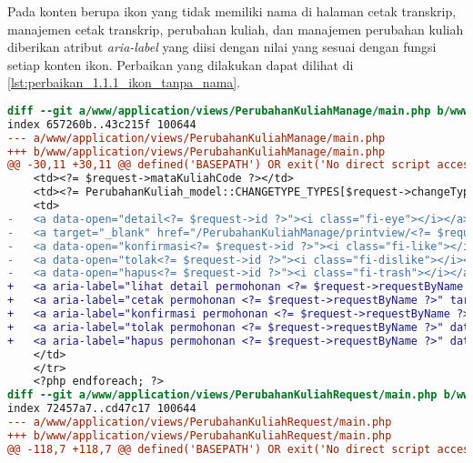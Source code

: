 Pada konten berupa ikon yang tidak memiliki nama di halaman cetak transkrip, manajemen cetak transkrip, perubahan kuliah, dan manajemen perubahan kuliah diberikan atribut \textit{aria-label} yang diisi dengan nilai yang sesuai dengan fungsi setiap konten ikon. Perbaikan yang dilakukan dapat dilihat di \ref{lst:perbaikan_1.1.1_ikon_tanpa_nama}.
\begin{lstlisting}[frame=single, label={lst:perbaikan_1.1.1_ikon_tanpa_nama}, language=diff, caption=Perbaikan Kriteria Sukses 1.1.1 - Ikon Tanpa Nama]
diff --git a/www/application/views/PerubahanKuliahManage/main.php b/www/application/views/PerubahanKuliahManage/main.php
index 657260b..43c215f 100644
--- a/www/application/views/PerubahanKuliahManage/main.php
+++ b/www/application/views/PerubahanKuliahManage/main.php
@@ -30,11 +30,11 @@ defined('BASEPATH') OR exit('No direct script access allowed');
    <td><?= $request->mataKuliahCode ?></td>
    <td><?= PerubahanKuliah_model::CHANGETYPE_TYPES[$request->changeType] ?></td>
    <td>
-   <a data-open="detail<?= $request->id ?>"><i class="fi-eye"></i></a>
-   <a target="_blank" href="/PerubahanKuliahManage/printview/<?= $request->id ?>"><i class="fi-print"></i></a>
-   <a data-open="konfirmasi<?= $request->id ?>"><i class="fi-like"></i></a>                                    
-   <a data-open="tolak<?= $request->id ?>"><i class="fi-dislike"></i></a>
-   <a data-open="hapus<?= $request->id ?>"><i class="fi-trash"></i></a>
+   <a aria-label="lihat detail permohonan <?= $request->requestByName ?>" data-open="detail<?= $request->id ?>"><i class="fi-eye"></i></a>
+   <a aria-label="cetak permohonan <?= $request->requestByName ?>" target="_blank" href="/PerubahanKuliahManage/printview/<?= $request->id ?>"><i class="fi-print"></i></a>
+   <a aria-label="konfirmasi permohonan <?= $request->requestByName ?>" data-open="konfirmasi<?= $request->id ?>"><i class="fi-like"></i></a>
+   <a aria-label="tolak permohonan <?= $request->requestByName ?>" data-open="tolak<?= $request->id ?>"><i class="fi-dislike"></i></a>
+   <a aria-label="hapus permohonan <?= $request->requestByName ?>" data-open="hapus<?= $request->id ?>"><i class="fi-trash"></i></a>
    </td>
    </tr>
    <?php endforeach; ?>
diff --git a/www/application/views/PerubahanKuliahRequest/main.php b/www/application/views/PerubahanKuliahRequest/main.php
index 72457a7..cd47c17 100644
--- a/www/application/views/PerubahanKuliahRequest/main.php
+++ b/www/application/views/PerubahanKuliahRequest/main.php
@@ -118,7 +118,7 @@ defined('BASEPATH') OR exit('No direct script access allowed');

\end{lstlisting}
